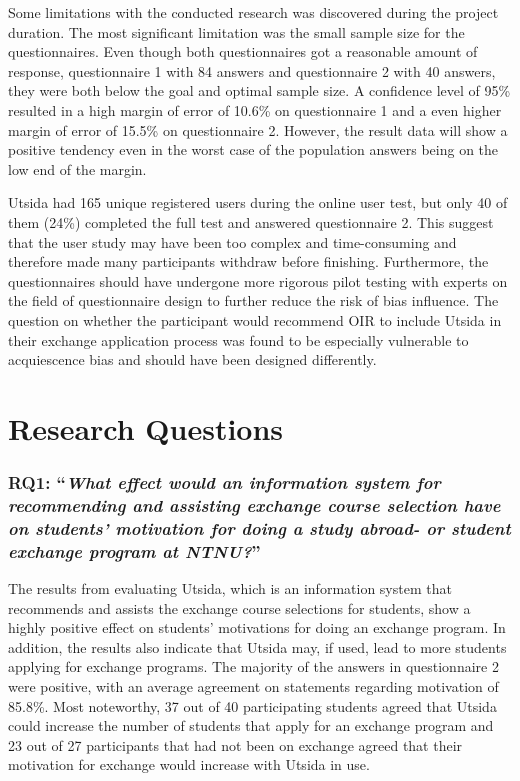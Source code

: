 Some limitations with the conducted research was discovered during the project duration. The most significant limitation was the small sample size for the questionnaires. Even though both questionnaires got a reasonable amount of response, questionnaire 1 with 84 answers and questionnaire 2 with 40 answers, they were both below the goal and optimal sample size. A confidence level of 95\% resulted in a high margin of error of 10.6\% on questionnaire 1 and a even higher margin of error of 15.5\% on questionnaire 2. However, the result data will show a positive tendency even in the worst case of the population answers being on the low end of the margin. 

Utsida had 165 unique registered users during the online user test, but only 40 of them (24\%) completed the full test and answered questionnaire 2. This suggest that the user study may have been too complex and time-consuming and therefore made many participants withdraw before finishing. Furthermore, the questionnaires should have undergone more rigorous pilot testing with experts on the field of questionnaire design to further reduce the risk of bias influence. The question on whether the participant would recommend OIR to include Utsida in their exchange application process was found to be especially vulnerable to acquiescence bias and should have been designed differently.

\section{Research Questions}

\subsubsection{RQ1: \enquote{\textit{What effect would an information system for recommending and assisting exchange course selection have on students' motivation for doing a study abroad- or student exchange program at NTNU?}}}

The results from evaluating Utsida, which is an information system that recommends and assists the exchange course selections for students, show a highly positive effect on students' motivations for doing an exchange program. In addition, the results also indicate that Utsida may, if used, lead to more students applying for exchange programs. The majority of the answers in questionnaire 2 were positive, with an average agreement on statements regarding motivation of 85.8\%. Most noteworthy, 37 out of 40 participating students agreed that Utsida could increase the number of students that apply for an exchange program and 23 out of 27 participants that had not been on exchange agreed that their motivation for exchange would increase with Utsida in use.

